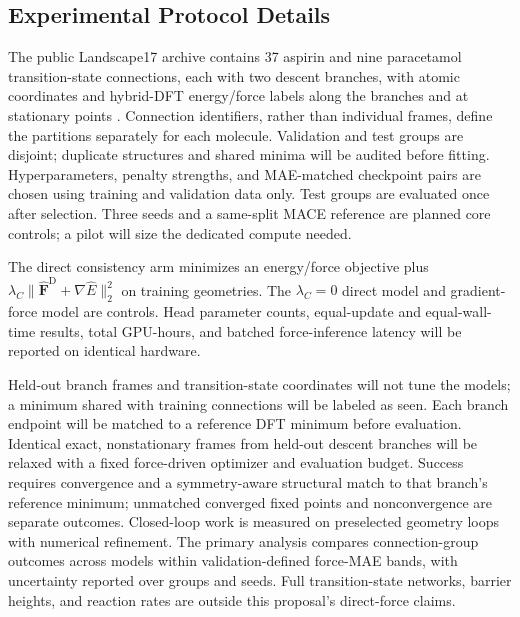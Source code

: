 \documentclass{article}
\begin{document}
\subsection*{Experimental Protocol Details}
The public Landscape17 archive contains 37 aspirin and nine paracetamol transition-state connections, each with two descent branches, with atomic coordinates and hybrid-DFT energy/force labels along the branches and at stationary points \cite{landscape}. Connection identifiers, rather than individual frames, define the partitions separately for each molecule. Validation and test groups are disjoint; duplicate structures and shared minima will be audited before fitting. Hyperparameters, penalty strengths, and MAE-matched checkpoint pairs are chosen using training and validation data only. Test groups are evaluated once after selection. Three seeds and a same-split MACE reference are planned core controls; a pilot will size the dedicated compute needed.

The direct consistency arm minimizes an energy/force objective plus $\lambda_C\|\hat{\mathbf F}^{\mathrm D}+\nabla\hat E\|_2^2$ on training geometries. The $\lambda_C=0$ direct model and gradient-force model are controls. Head parameter counts, equal-update and equal-wall-time results, total GPU-hours, and batched force-inference latency will be reported on identical hardware.

Held-out branch frames and transition-state coordinates will not tune the models; a minimum shared with training connections will be labeled as seen. Each branch endpoint will be matched to a reference DFT minimum before evaluation. Identical exact, nonstationary frames from held-out descent branches will be relaxed with a fixed force-driven optimizer and evaluation budget. Success requires convergence and a symmetry-aware structural match to that branch's reference minimum; unmatched converged fixed points and nonconvergence are separate outcomes. Closed-loop work is measured on preselected geometry loops with numerical refinement. The primary analysis compares connection-group outcomes across models within validation-defined force-MAE bands, with uncertainty reported over groups and seeds. Full transition-state networks, barrier heights, and reaction rates are outside this proposal's direct-force claims.
\end{document}
